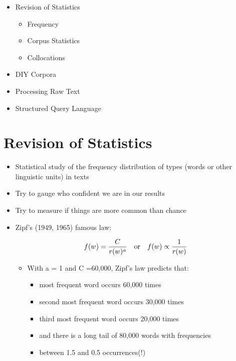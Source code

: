 \documentclass[a4paper,landscape,headrule,footrule,dvips]{foils}
\begin{document}
\begin{CJK}{UTF8}{min}

\maketitle



\begin{itemize} 
\item Revision  of Statistics
  \begin{itemize} 
  \item Frequency
  \item Corpus Statistics
  \item Collocations
\end{itemize}
\item DIY Corpora
\item Processing Raw Text
\item Structured Query Language
\end{itemize}


\section{Revision  of Statistics}



\begin{itemize}
\item Statistical study of the frequency distribution of types
(words or other linguistic units) in texts
\item Try to gauge who confident we are in our results
\item Try to measure if things are more common than chance
\end{itemize}


\begin{itemize}
\item  Zipf’s (1949, 1965) famous law:

  \begin{equation}
    \label{eq:1}
    f(w) = \frac{C}{r(w)^a}\ \ \  \textnormal{or} \ \ \  f(w) \propto \frac{1}{r(w)}
  \end{equation}
\begin{itemize}
  \item With a = 1 and C =60,000, Zipf’s law predicts that:
\begin{itemize}
  \item most frequent word occurs 60,000 times
  \item second most frequent word occurs 30,000 times
  \item third most frequent word occurs 20,000 times
  \item and there is a long tail of 80,000 words with frequencies
  \item between 1.5 and 0.5 occurrences(!)
  \end{itemize}
\end{itemize}
\end{itemize}


\end{CJK}
\end{document}

